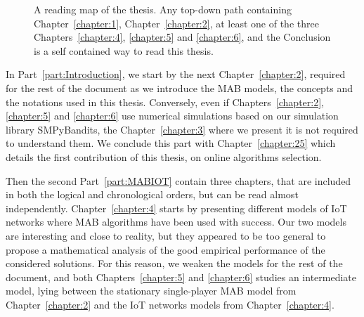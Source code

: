 \begin{figure}[h!]
{
    }
    \caption[Organization of the thesis: a reading map]{A reading map of the thesis. Any top-down path containing Chapter~\ref{chapter:1}, Chapter~\ref{chapter:2}, at least one of the three Chapters~\ref{chapter:4}, \ref{chapter:5} and \ref{chapter:6}, and the Conclusion is a self contained way to read this thesis.}
    \label{fig:1:organization}
\end{figure}

In Part~\ref{part:Introduction}, we start by the next Chapter~\ref{chapter:2}, required for the rest of the document as we introduce the MAB models, the concepts and the notations used in this thesis.
Conversely, even if Chapters~\ref{chapter:2}, \ref{chapter:5} and \ref{chapter:6} use numerical simulations based on our simulation library SMPyBandits, the Chapter~\ref{chapter:3} where we present it is not required to understand them.
We conclude this part with Chapter~\ref{chapter:25} which details the first contribution of this thesis, on online algorithms selection.

Then the second Part~\ref{part:MABIOT} contain three chapters, that are included in both the logical and chronological orders, but can be read almost independently.
Chapter~\ref{chapter:4} starts by presenting different models of IoT networks where MAB algorithms have been used with success. Our two models are interesting and close to reality, but they appeared to be too general to propose a mathematical analysis of the good empirical performance of the considered solutions.
For this reason, we weaken the models for the rest of the document,
and both Chapters~\ref{chapter:5} and \ref{chapter:6} studies an intermediate model, lying between the stationary single-player MAB model from Chapter~\ref{chapter:2} and the IoT networks models from Chapter~\ref{chapter:4}.


